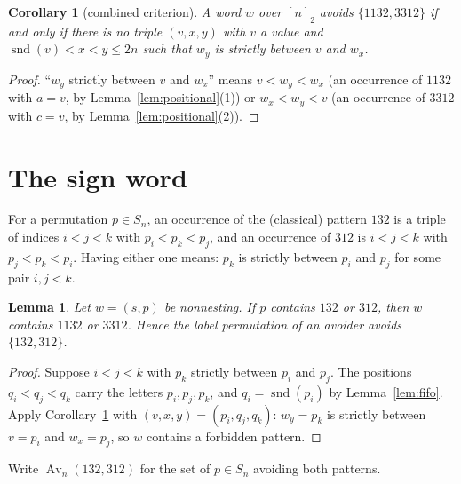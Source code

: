 \documentclass[11pt]{article}
\newtheorem{lemma}[theorem]{Lemma}
\newtheorem{corollary}[theorem]{Corollary}
\theoremstyle{definition}
\theoremstyle{remark}
\newcommand{\nn}{[n]_2}
\DeclareMathOperator{\snd}{snd}
\newcommand{\Av}{\operatorname{Av}}
\begin{document}
\begin{corollary}[combined criterion]\label{cor:combined}
A word $w$ over $\nn$ avoids $\{1132,3312\}$ if and only if there is
\emph{no} triple $(v,x,y)$ with $v$ a value and $\snd(v)<x<y\le 2n$ such
that $w_y$ is strictly between $v$ and $w_x$.
\end{corollary}

\begin{proof}
``$w_y$ strictly between $v$ and $w_x$'' means $v<w_y<w_x$ (an occurrence of
$1132$ with $a=v$, by Lemma~\ref{lem:positional}(1)) or $w_x<w_y<v$ (an
occurrence of $3312$ with $c=v$, by Lemma~\ref{lem:positional}(2)).
\end{proof}

\section{The sign word}\label{sec:sign}

For a permutation $p\in S_n$, an occurrence of the (classical) pattern $132$
is a triple of indices $i<j<k$ with $p_i<p_k<p_j$, and an occurrence of
$312$ is $i<j<k$ with $p_j<p_k<p_i$. Having either one means: $p_k$ is
strictly between $p_i$ and $p_j$ for some pair $i,j<k$.

\begin{lemma}\label{lem:labels}
Let $w=(s,p)$ be nonnesting. If $p$ contains $132$ or $312$, then $w$
contains $1132$ or $3312$. Hence the label permutation of an avoider avoids
$\{132,312\}$.
\end{lemma}

\begin{proof}
Suppose $i<j<k$ with $p_k$ strictly between $p_i$ and $p_j$. The positions
$q_i<q_j<q_k$ carry the letters $p_i,p_j,p_k$, and $q_i=\snd(p_i)$ by
Lemma~\ref{lem:fifo}. Apply Corollary~\ref{cor:combined} with
$(v,x,y)=(p_i,q_j,q_k)$: $w_y=p_k$ is strictly between $v=p_i$ and
$w_x=p_j$, so $w$ contains a forbidden pattern.
\end{proof}

Write $\Av_n(132,312)$ for the set of $p\in S_n$ avoiding both patterns.
\end{document}
